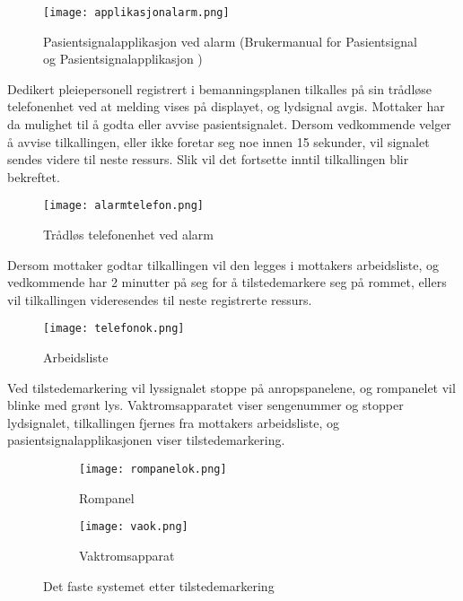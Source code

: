 \begin{figure}[H]
\centering
\texttt{[image: applikasjonalarm.png]}
\caption{Pasientsignalapplikasjon ved alarm (Brukermanual for Pasientsignal og Pasientsignalapplikasjon )}
\label{alarmprosess}
\end{figure}

\noindent
Dedikert pleiepersonell registrert i bemanningsplanen tilkalles på sin trådløse telefonenhet ved at melding vises på displayet, og lydsignal avgis. Mottaker har da mulighet til å godta eller avvise pasientsignalet. Dersom vedkommende velger å avvise tilkallingen, eller ikke foretar seg noe innen 15 sekunder, vil signalet sendes videre til neste ressurs. Slik vil det fortsette inntil tilkallingen blir bekreftet.

\begin{figure}[H]
\centering
\texttt{[image: alarmtelefon.png]}
\caption{Trådløs telefonenhet ved alarm}
\label{alarmprosess}
\end{figure}

\noindent
Dersom mottaker godtar tilkallingen vil den legges i mottakers arbeidsliste, og vedkommende har 2 minutter på seg for å tilstedemarkere seg på rommet, ellers vil tilkallingen videresendes til neste registrerte ressurs.

\begin{figure}[H]
\centering
\texttt{[image: telefonok.png]}
\caption{Arbeidsliste}
\label{alarmprosess}
\end{figure}

\noindent
Ved tilstedemarkering vil lyssignalet stoppe på anropspanelene, og rompanelet vil blinke med grønt lys. Vaktromsapparatet viser sengenummer og stopper lydsignalet, tilkallingen fjernes fra mottakers arbeidsliste, og pasientsignalapplikasjonen viser tilstedemarkering.
 
\begin{figure}[H]
        \centering
        \begin{subfigure}[b]{0.35\textwidth}
        		\centering
                \texttt{[image: rompanelok.png]}
                \caption{Rompanel}
                \label{rompanelok}
        \end{subfigure}
        \begin{subfigure}[b]{0.25\textwidth}
        		\centering
                \texttt{[image: vaok.png]}
                \caption{Vaktromsapparat}
                \label{vaok}
        \end{subfigure}
        \caption{Det faste systemet etter tilstedemarkering}
\end{figure} 

